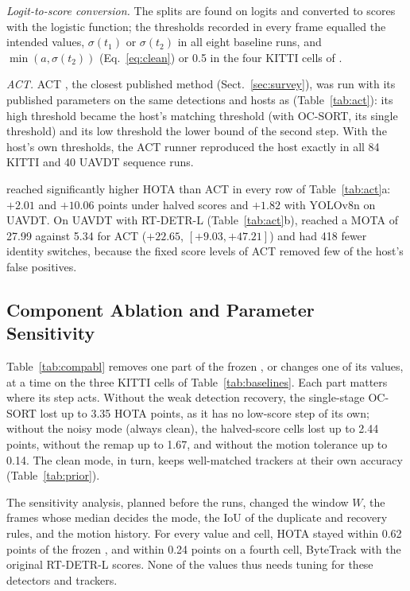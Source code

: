 

\emph{Logit-to-score conversion.} The splits are found on logits and converted to scores with the
logistic function; the thresholds recorded in every frame equalled the intended values, $\sigma(t_1)$
or $\sigma(t_2)$ in all eight baseline runs, and $\min(a,\sigma(t_2))$ (Eq.~\eqref{eq:clean}) or 0.5
in the four KITTI cells of \scl{}.

\emph{ACT.} ACT \cite{act2026adaptive}, the closest published method (Sect.~\ref{sec:survey}), was run with its published parameters on the same detections and hosts as
\scl{} (Table~\ref{tab:act}): its high threshold became the host's matching threshold (with OC-SORT,
its single threshold) and its low threshold the lower bound of the second step. With the host's own
thresholds, the ACT runner reproduced the host exactly in all 84 KITTI and 40 UAVDT
sequence runs.



\scl{} reached
significantly higher HOTA than ACT in every row of Table~\ref{tab:act}a: $+2.01$ and $+10.06$ points
under halved scores and $+1.82$ with YOLOv8n on UAVDT. On UAVDT with RT-DETR-L
(Table~\ref{tab:act}b), \scl{} reached a MOTA of 27.99 against 5.34 for ACT ($+22.65$,
$[+9.03,+47.21]$) and had 418 fewer identity switches, because the fixed score levels of ACT
removed few of the host's false positives.

\subsection{Component Ablation and Parameter Sensitivity}\label{sec:ablation}
Table~\ref{tab:compabl} removes one part of the frozen \scl{}, or changes one of its values, at a
time on the three KITTI cells of Table~\ref{tab:baselines}. Each part matters where its step acts.
Without the weak detection recovery, the single-stage OC-SORT lost up to 3.35 HOTA points, as it has
no low-score step of its own; without the noisy mode (always clean), the halved-score cells lost up
to 2.44 points, without the remap up to 1.67, and without the motion tolerance up to 0.14. The clean
mode, in turn, keeps well-matched trackers at their own accuracy (Table~\ref{tab:prior}).



The sensitivity analysis, planned before the runs, changed the window $W$, the frames whose median
decides the mode, the IoU of the duplicate and recovery rules, and the motion history. For every
value and cell, HOTA stayed within 0.62 points of the frozen \scl{}, and within 0.24 points on a
fourth cell, ByteTrack with the original RT-DETR-L scores. None of the values thus needs tuning for
these detectors and trackers.

